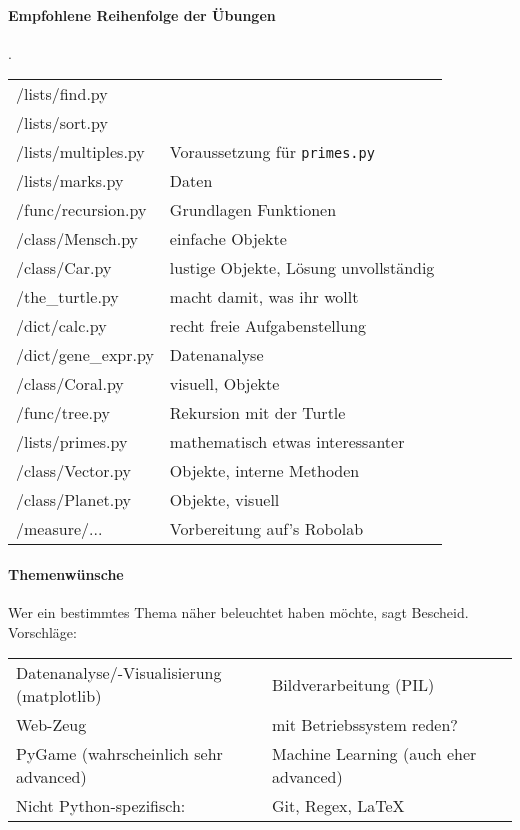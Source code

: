 \documentclass{article}
\begin{document}
\paragraph{Empfohlene Reihenfolge der Übungen} .\\
	\begin{tabular}{l|l}
		/lists/find.py \\
		/lists/sort.py \\
		/lists/multiples.py & Voraussetzung für \texttt{primes.py} \\
		/lists/marks.py & Daten \\
		/func/recursion.py & Grundlagen Funktionen \\
		/class/Mensch.py & einfache Objekte \\
		/class/Car.py & lustige Objekte, Lösung unvollständig \\
		/the\_turtle.py & macht damit, was ihr wollt \\
		/dict/calc.py & recht freie Aufgabenstellung \\
		/dict/gene\_expr.py & Datenanalyse \\
		/class/Coral.py & visuell, Objekte \\
		/func/tree.py & Rekursion mit der Turtle \\
		/lists/primes.py & mathematisch etwas interessanter \\
		/class/Vector.py & Objekte, interne Methoden \\
		/class/Planet.py & Objekte, visuell \\
		/measure/... & Vorbereitung auf's Robolab \\
	\end{tabular}

\newpage
\paragraph{Themenwünsche}
	Wer ein bestimmtes Thema näher beleuchtet haben möchte, sagt Bescheid. Vorschläge: \\
	\begin{tabular}{ll}
		Datenanalyse/-Visualisierung (matplotlib) &
		Bildverarbeitung (PIL) \\
		Web-Zeug &
		mit Betriebssystem reden? \\
		PyGame (wahrscheinlich sehr advanced) &
		Machine Learning (auch eher advanced) \\
		Nicht Python-spezifisch: & Git, Regex, \LaTeX
	\end{tabular}
\end{document}
